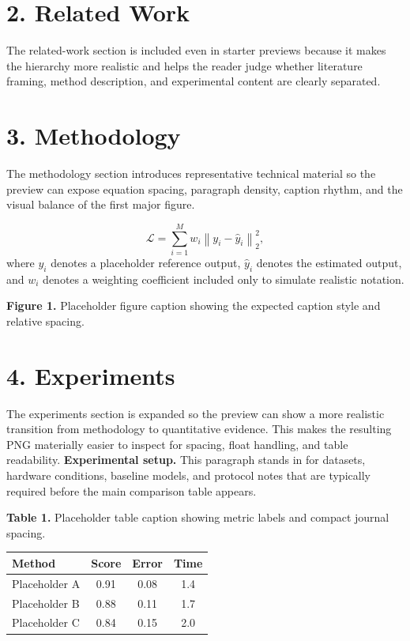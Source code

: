 \documentclass[10pt,a4paper]{article}
\begin{document}
\section*{2. Related Work}
The related-work section is included even in starter previews because it makes the hierarchy more realistic and helps the reader judge whether literature framing, method description, and experimental content are clearly separated.

\section*{3. Methodology}
The methodology section introduces representative technical material so the preview can expose equation spacing, paragraph density, caption rhythm, and the visual balance of the first major figure.

\begin{equation}
\mathcal{L} = \sum_{i=1}^{M} w_i \left\| y_i - \hat{y}_i \right\|_2^2,
\end{equation}
where $y_i$ denotes a placeholder reference output, $\hat{y}_i$ denotes the estimated output, and $w_i$ denotes a weighting coefficient included only to simulate realistic notation.


\begin{center}\end{center}\noindent\textbf{Figure 1.} Placeholder figure caption showing the expected caption style and relative spacing.\par\vspace{0.5em}

\section*{4. Experiments}
The experiments section is expanded so the preview can show a more realistic transition from methodology to quantitative evidence. This makes the resulting PNG materially easier to inspect for spacing, float handling, and table readability.
\textbf{Experimental setup.} This paragraph stands in for datasets, hardware conditions, baseline models, and protocol notes that are typically required before the main comparison table appears.

\noindent\textbf{Table 1.} Placeholder table caption showing metric labels and compact journal spacing.\par\begin{center}
\begin{tabular}{lccc}
\toprule
Method & Score & Error & Time\\
\midrule
Placeholder A & 0.91 & 0.08 & 1.4\\
Placeholder B & 0.88 & 0.11 & 1.7\\
Placeholder C & 0.84 & 0.15 & 2.0\\
\bottomrule
\end{tabular}\end{center}\vspace{0.5em}
\end{document}
